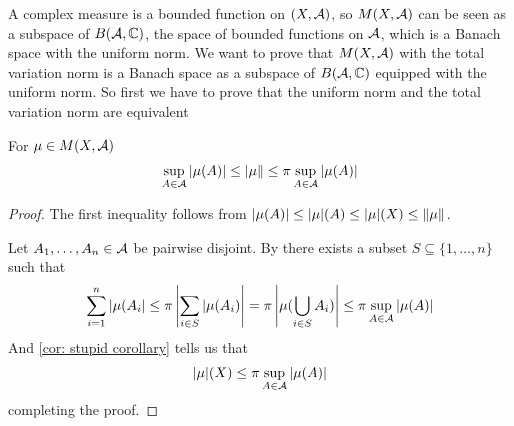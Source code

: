 A complex measure is a bounded function on $(X, \mathcal{A})$, so $M(X, \mathcal{A})$ can be seen as a subspace of $B(\mathcal{A}, \mathbb{C})$, the space of bounded functions on $\mathcal{A}$, which is a Banach space with the uniform norm. We want to prove that $M(X, \mathcal{A})$ with the total variation norm is a Banach space as a subspace of $B(\mathcal{A}, \mathbb{C})$ equipped with the uniform norm. So first we have to prove that the uniform norm and the total variation norm are equivalent

\begin{lemma}
For $\mu \in M(X, \mathcal{A})$
\begin{align*}
	\sup_{A\in \mathcal{A}} |\mu(A)| \le \vert \mu \Vert \le \pi \sup_{A\in \mathcal{A}} |\mu(A)|
\end{align*}
\end{lemma}
\begin{proof}
The first inequality follows from $|\mu(A)| \le |\mu|(A)\le |\mu|(X) \le \Vert{\mu}\Vert_{}$.

Let $A_{1},\dots,A_{n}\in \mathcal{A}$ be pairwise disjoint. By  there exists a subset $S\subseteq \{1,\dots, n\}$ such that
\begin{align*}
	\sum_{i=1}^{n}|\mu(A_{i}| \le \pi \left| \sum_{i\in S}|\mu(A_{i}) \right| = \pi \left| \mu(\bigcup_{i\in S} A_{i}) \right| \le \pi \sup_{A\in \mathcal{A}} |\mu(A)|
\end{align*}
And \cref{cor: stupid corollary} tells us that
\begin{align*}
	|\mu|(X)\le \pi \sup_{A\in \mathcal{A}} |\mu(A)|
\end{align*}
completing the proof.
\end{proof}


